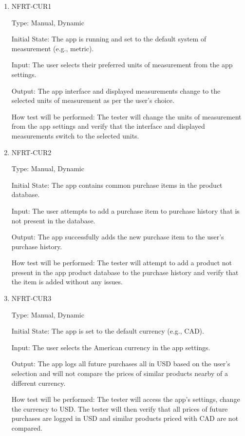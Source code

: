 \documentclass[12pt, titlepage]{article}
\begin{document}
\begin{enumerate}

\item{NFRT-CUR1\\}

Type: Manual, Dynamic
					
Initial State: The app is running and set to the default system of measurement (e.g., metric).
					
Input: The user selects their preferred units of measurement from the app settings.
					
Output: The app interface and displayed measurements change to the selected units of measurement as per the user's choice.
					
How test will be performed: The tester will change the units of measurement from the app settings and verify that the interface and displayed measurements switch to the selected units.
					
\item{NFRT-CUR2\\}

Type: Manual, Dynamic
					
Initial State: The app contains common purchase items in the product database.
					
Input: The user attempts to add a purchase item to purchase history that is not present in the database.
					
Output: The app successfully adds the new purchase item to the user's purchase history.
					
How test will be performed: The tester will attempt to add a product not present in the app product database to the purchase history and verify that the item is added without any issues.

\item{NFRT-CUR3\\}

Type: Manual, Dynamic
					
Initial State: The app is set to the default currency (e.g., CAD).
					
Input: The user selects the American currency in the app settings.
					
Output: The app logs all future purchases all in USD based on the user's selection and will not compare the prices of similar products nearby of a different currency.
					
How test will be performed: The tester will access the app's settings, change the currency to USD. The tester will then verify that all prices of future purchases are logged in USD and similar products priced with CAD are not compared.

\end{enumerate}
\end{document}
